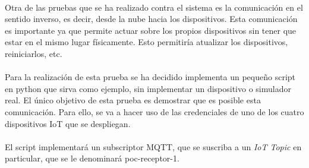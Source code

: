 \documentclass[../../memoria.tex]{subfiles}
\begin{document}
\paragraph{}
Otra de las pruebas que se ha realizado contra el sistema es la comunicación en el sentido inverso, es decir, desde la nube hacia los dispositivos. Esta comunicación es importante ya que permite actuar sobre los propios dispositivos sin tener que estar en el mismo lugar físicamente. Esto permitiría atualizar los dispositivos, reiniciarlos, etc.

\paragraph{}
Para la realización de esta prueba se ha decidido implementa un pequeño script en python que sirva como ejemplo, sin implementar un dispositivo o simulador real. El único objetivo de esta prueba es demostrar que es posible esta comunicación. Para ello, se va a hacer uso de las credenciales de uno de los cuatro dispositivos IoT que se despliegan.

\paragraph{}
El script implementará un subscriptor MQTT, que se suscriba a un \textit{IoT Topic} en particular, que se le denominará poc-receptor-1.
\end{document}
